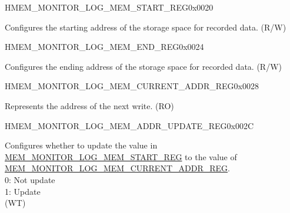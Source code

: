 \begin{register}{H}{MEM\_MONITOR\_LOG\_MEM\_START\_REG}{0x0020}\label{regdesc:MEMMONITORLOGMEMSTARTREG}
%
\regnewline%
\begin{regdesc}\begin{reglist}
\label{fielddesc:MEMMONITORLOGMEMSTART}\item [MEM\_MONITOR\_LOG\_MEM\_START] Configures the starting address of the storage space for recorded data. (R/W)
\end{reglist}\end{regdesc}
\end{register}


\begin{register}{H}{MEM\_MONITOR\_LOG\_MEM\_END\_REG}{0x0024}\label{regdesc:MEMMONITORLOGMEMENDREG}
%
\regnewline%
\begin{regdesc}\begin{reglist}
\label{fielddesc:MEMMONITORLOGMEMEND}\item [MEM\_MONITOR\_LOG\_MEM\_END] Configures the ending address of the storage space for recorded data. (R/W)
\end{reglist}\end{regdesc}
\end{register}


\begin{register}{H}{MEM\_MONITOR\_LOG\_MEM\_CURRENT\_ADDR\_REG}{0x0028}\label{regdesc:MEMMONITORLOGMEMCURRENTADDRREG}
%
\regnewline%
\begin{regdesc}\begin{reglist}
\label{fielddesc:MEMMONITORLOGMEMCURRENTADDR}\item [MEM\_MONITOR\_LOG\_MEM\_CURRENT\_ADDR] Represents the address of the next write. (RO)
\end{reglist}\end{regdesc}
\end{register}


\begin{register}{H}{MEM\_MONITOR\_LOG\_MEM\_ADDR\_UPDATE\_REG}{0x002C}\label{regdesc:MEMMONITORLOGMEMADDRUPDATEREG}
%
%
\regnewline%
\begin{regdesc}\begin{reglist}
\label{fielddesc:MEMMONITORLOGMEMADDRUPDATE}\item [MEM\_MONITOR\_LOG\_MEM\_ADDR\_UPDATE] Configures whether to update the value in \hyperref[regdesc:MEMMONITORLOGMEMSTARTREG]{MEM\_MONITOR\_LOG\_MEM\_START\_REG} to the value of \hyperref[regdesc:MEMMONITORLOGMEMCURRENTADDRREG]{MEM\_MONITOR\_LOG\_MEM\_CURRENT\_ADDR\_REG}.\\
0: Not update \\
1: Update \\
(WT)
\end{reglist}\end{regdesc}
\end{register}


